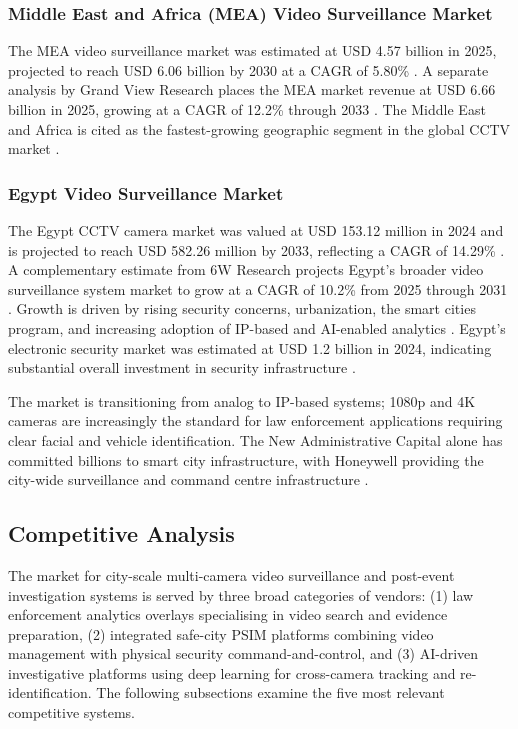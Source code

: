 \subsubsection{Middle East and Africa (MEA) Video Surveillance Market}

The MEA video surveillance market was estimated at USD 4.57 billion in 2025, projected to reach USD 6.06 billion by 2030 at a CAGR of 5.80\% \cite{mordorintelligence_mea}. A separate analysis by Grand View Research places the MEA market revenue at USD 6.66 billion in 2025, growing at a CAGR of 12.2\% through 2033 \cite{grandview_mea}. The Middle East and Africa is cited as the fastest-growing geographic segment in the global CCTV market \cite{mordorintelligence_cctv}.

\subsubsection{Egypt Video Surveillance Market}

The Egypt CCTV camera market was valued at USD 153.12 million in 2024 and is projected to reach USD 582.26 million by 2033, reflecting a CAGR of 14.29\% \cite{imarc_egypt}. A complementary estimate from 6W Research projects Egypt's broader video surveillance system market to grow at a CAGR of 10.2\% from 2025 through 2031 \cite{sixw_egypt}. Growth is driven by rising security concerns, urbanization, the smart cities program, and increasing adoption of IP-based and AI-enabled analytics \cite{imarc_egypt, sixw_egypt}. Egypt's electronic security market was estimated at USD 1.2 billion in 2024, indicating substantial overall investment in security infrastructure \cite{imarc_egypt}.

The market is transitioning from analog to IP-based systems; 1080p and 4K cameras are increasingly the standard for law enforcement applications requiring clear facial and vehicle identification. The New Administrative Capital alone has committed billions to smart city infrastructure, with Honeywell providing the city-wide surveillance and command centre infrastructure \cite{honeywell_nac, egypt_nac_59b}.

\subsection{Competitive Analysis}

The market for city-scale multi-camera video surveillance and post-event investigation systems is served by three broad categories of vendors: (1) law enforcement analytics overlays specialising in video search and evidence preparation, (2) integrated safe-city PSIM platforms combining video management with physical security command-and-control, and (3) AI-driven investigative platforms using deep learning for cross-camera tracking and re-identification. The following subsections examine the five most relevant competitive systems.

